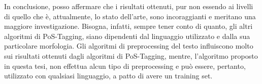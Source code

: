 In conclusione, posso affermare che i risultati ottenuti, pur non essendo ai livelli
di quello che \`e, attualmente, lo stato dell'arte, sono incoraggianti e meritano una
maggiore investigazione. Bisogna, infatti, sempre tener conto di quanto, gli altri
algoritmi di PoS-Tagging, siano dipendenti dal linguaggio utilizzato e dalla sua
particolare morfologia. Gli algoritmi di preprocessing del testo influiscono molto
sui risultati ottenuti dagli algoritmi di PoS-Tagging, mentre, l'algoritmo proposto
in questa tesi, non effettua alcun tipo di preprocessing e pu\`o essere, pertanto,
utilizzato con qualsiasi linguaggio, a patto di avere un training set.
